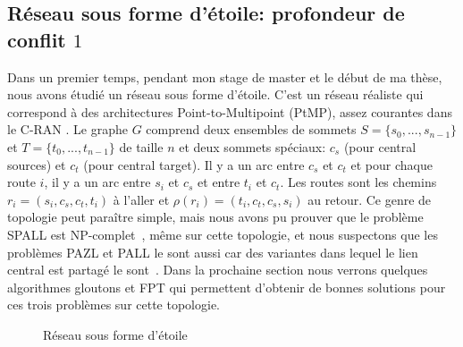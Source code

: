 \documentclass{article}
\begin{document}
  \subsection{Réseau sous forme d'étoile: profondeur de conflit $1$}
	
	
Dans un premier temps, pendant mon stage de master et le début de ma thèse, nous avons étudié un réseau sous forme d'étoile. C'est un réseau réaliste qui correspond à des architectures Point-to-Multipoint (PtMP), assez courantes dans le C-RAN \cite{tayq2017real}. 
Le graphe $G$ comprend deux ensembles de sommets $S=\{s_0,...,s_{n-1}\}$ et $T=\{t_0,...,t_{n-1}\}$ de taille $n$ et deux sommets spéciaux: {\bf $c_s$} (pour central sources) et {\bf $c_t$} (pour central target).
    Il y a un arc entre {\bf $c_s$} et {\bf $c_t$} et pour chaque route $i$, il y a un arc entre $s_i$ et $c_s$ et entre $t_i$ et $c_t$.
      Les routes sont les chemins $r_i = (s_i,c_s,c_t,t_i)$ à l'aller et  $\rho(r_i) = (t_i,c_t,c_s,s_i)$ au retour. 
      Ce genre de topologie peut paraître simple, mais nous avons pu prouver que le problème SPALL est NP-complet~\cite{orman1997complexity}, même sur cette topologie, et nous suspectons que les problèmes PAZL et PALL le sont aussi car des variantes dans lequel le lien central est partagé le sont~\cite{yu2004minimizing}. Dans la prochaine section nous verrons quelques algorithmes gloutons et FPT qui permettent d'obtenir de bonnes solutions pour ces trois problèmes sur cette topologie.
      \begin{figure}
       \begin{center}

  \end{center}
  \caption{Réseau sous forme d'étoile}
  \end{figure}
  
\end{document}

